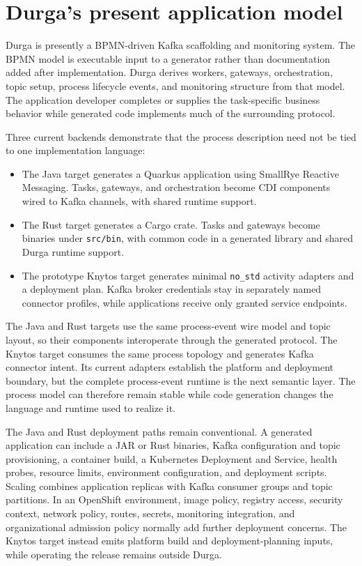 \section{Durga's present application model}

Durga is presently a BPMN-driven Kafka scaffolding and monitoring system. The
BPMN model is executable input to a generator rather than documentation added
after implementation. Durga derives workers, gateways, orchestration, topic
setup, process lifecycle events, and monitoring structure from that model. The
application developer completes or supplies the task-specific business
behavior while generated code implements much of the surrounding protocol.

Three current backends demonstrate that the process description need not be tied
to one implementation language:

\begin{itemize}
    \item The Java target generates a Quarkus application using SmallRye
        Reactive Messaging. Tasks, gateways, and orchestration become CDI
        components wired to Kafka channels, with shared runtime support.

    \item The Rust target generates a Cargo crate. Tasks and gateways become
        binaries under \texttt{src/bin}, with common code in a generated
        library and shared Durga runtime support.

    \item The prototype Knytos target generates minimal \texttt{no\_std}
        activity adapters and a deployment plan. Kafka broker credentials stay
        in separately named connector profiles, while applications receive only
        granted service endpoints.
\end{itemize}

The Java and Rust targets use the same process-event wire model and topic
layout, so their components interoperate through the generated protocol. The
Knytos target consumes the same process topology and generates Kafka
connector intent. Its current adapters establish the platform and deployment
boundary, but the complete process-event runtime is the next semantic layer. The
process model can therefore remain stable while code generation changes the
language and runtime used to realize it.

The Java and Rust deployment paths remain conventional. A generated application
can include a JAR or Rust binaries, Kafka configuration and topic provisioning,
a container build, a Kubernetes Deployment and Service, health probes, resource
limits, environment configuration, and deployment scripts. Scaling combines
application replicas with Kafka consumer groups and topic partitions. In an
OpenShift environment, image policy, registry access, security context,
network policy, routes, secrets, monitoring integration, and organizational
admission policy normally add further deployment concerns. The Knytos
target instead emits platform build and deployment-planning inputs, while operating
the release remains outside Durga.

